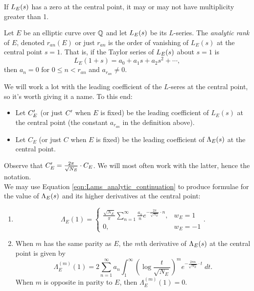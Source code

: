 If $L_E(s)$ has a zero at the central point, it may or may not have multiplicity greater than 1.
\begin{definition}
Let $E$ be an elliptic curve over $\mathbb{Q}$ and let $L_E(s)$ be its $L$-series. The {\it analytic rank} of $E$, denoted $r_{an}(E)$ or just $r_{an}$ is the order of vanishing of $L_E(s)$ at the central point $s=1$. That is, if the Taylor series of $L_E(s)$ about $s=1$ is
\begin{equation}
L_E(1+s) = a_0 + a_1 s + a_2 s^2 + \cdots,
\end{equation}
then $a_n = 0$ for $0 \le n < r_{an}$ and $a_{r_{an}} \ne 0$.
\end{definition}
We will work a lot with the leading coefficient of the $L$-seres at the central point, so it's worth giving it a name. To this end:
\begin{definition} \mbox{}
\begin{itemize}
\item Let $C^{\prime}_E$ (or just $C^{\prime}$ when $E$ is fixed) be the leading coefficient of $L_E(s)$ at the central point (the constant $a_{r_{an}}$ in the definition above).
\item Let $C_E$ (or just $C$ when $E$ is fixed) be the leading coefficient of $\Lambda_E(s)$ at the central point.
\end{itemize}
\end{definition}
Observe that $C^{\prime}_E = \frac{2\pi}{\sqrt{N_E}}\cdot C_E$. We will most often work with the latter, hence the notation. \\

We may use Equation \ref{eqn:Lams_analytic_continuation} to produce formulae for the value of $\Lambda_E(s)$ and its higher derivatives at the central point:
\begin{proposition} \mbox{}
\begin{enumerate}
\item \begin{equation}
\Lambda_E(1) = \begin{cases} \frac{\sqrt{N_E}}{\pi} \sum_{n=1}^{\infty}\frac{a_n}{n} e^{-\frac{2\pi}{\sqrt{N_E}}\cdot n}, & w_E = 1 \\ 0, & w_E = -1 \end{cases}.
\end{equation}
\item When $m$ has the same parity as $E$, the $m$th derivative of $\Lambda_E(s)$ at the central point is given by
\begin{equation}\label{eqn:central_derivatives}
\Lambda_E^{(m)}(1) = 2 \sum_{n=1}^\infty a_n \int_{1}^{\infty} \left(\log \frac{t}{\sqrt{N_E}}\right)^m e^{-\frac{2\pi n}{\sqrt{N_E}}\cdot t} \; dt.
\end{equation}
When $m$ is opposite in parity to $E$, then $\Lambda_E^{(m)}(1) = 0$.
\end{enumerate}
\end{proposition}

